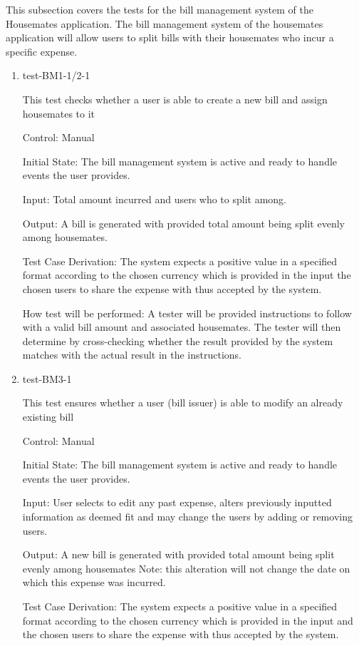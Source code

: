 \documentclass[12pt, titlepage]{article}
\begin{document}
This subsection covers the tests for the bill management system of the Housemates application. The bill management system of the housemates application will allow users to split bills with their housemates who incur a specific expense.

\begin{enumerate}

\item{test-BM1-1/2-1\\}

This test checks whether a user is able to create a new bill and assign housemates to it

Control: Manual
					
Initial State: The bill management system is active and ready to handle events the user provides.
					
Input: Total amount incurred and users who to split among.
					
Output: A bill is generated with provided total amount being split evenly among housemates.

Test Case Derivation: The system expects a positive value in a specified format according to the chosen currency which is provided in the input the chosen users to share the expense with thus accepted by the system.
					
How test will be performed: A tester will be provided instructions to follow with a valid bill amount and associated housemates. The tester will then determine by cross-checking whether the result provided by the system matches with the actual result in the instructions.
					
\item{test-BM3-1\\}

This test ensures whether a user (bill issuer) is able to modify an already existing bill

Control: Manual
					
Initial State: The bill management system is active and ready to handle events the user provides.
					
Input: User selects to edit any past expense, alters previously inputted information as deemed fit and may change the users by adding or removing users. 
					
Output: A new bill is generated with provided total amount being split evenly among housemates Note: this alteration will not change the date on which this expense was incurred.

Test Case Derivation: The system expects a positive value in a specified format according to the chosen currency which is provided in the input and the chosen users to share the expense with thus accepted by the system.


\end{enumerate}
\end{document}
